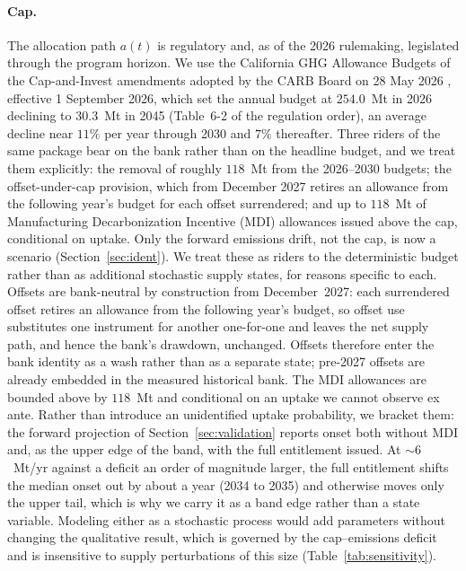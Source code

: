 \documentclass[11pt,letterpaper]{article}
\theoremstyle{plain}
\theoremstyle{definition}
\numberwithin{equation}{section}
\begin{document}
\paragraph{Cap.} The allocation path $a(t)$ is regulatory and, as of the 2026 rulemaking, legislated through the program horizon. We use the California GHG Allowance Budgets of the Cap-and-Invest amendments adopted by the CARB Board on 28 May 2026 \citep{carb2026capinvest}, effective 1 September 2026, which set the annual budget at $254.0$~Mt in 2026 declining to $30.3$~Mt in 2045 (Table~6-2 of the regulation order), an average decline near $11\%$ per year through 2030 and $7\%$ thereafter. Three riders of the same package bear on the bank rather than on the headline budget, and we treat them explicitly: the removal of roughly $118$~Mt from the 2026--2030 budgets; the offset-under-cap provision, which from December 2027 retires an allowance from the following year's budget for each offset surrendered; and up to $118$~Mt of Manufacturing Decarbonization Incentive (MDI) allowances issued above the cap, conditional on uptake. Only the forward emissions drift, not the cap, is now a scenario (Section~\ref{sec:ident}). We treat these as riders to the deterministic budget rather than as additional stochastic supply states, for reasons specific to each. Offsets are bank-neutral by construction from December~2027: each surrendered offset retires an allowance from the following year's budget, so offset use substitutes one instrument for another one-for-one and leaves the net supply path, and hence the bank's drawdown, unchanged. Offsets therefore enter the bank identity as a wash rather than as a separate state; pre-2027 offsets are already embedded in the measured historical bank. The MDI allowances are bounded above by $118$~Mt and conditional on an uptake we cannot observe ex ante. Rather than introduce an unidentified uptake probability, we bracket them: the forward projection of Section~\ref{sec:validation} reports onset both without MDI and, as the upper edge of the band, with the full entitlement issued. At $\sim6$~Mt/yr against a deficit an order of magnitude larger, the full entitlement shifts the median onset out by about a year (2034 to 2035) and otherwise moves only the upper tail, which is why we carry it as a band edge rather than a state variable. Modeling either as a stochastic process would add parameters without changing the qualitative result, which is governed by the cap--emissions deficit and is insensitive to supply perturbations of this size (Table~\ref{tab:sensitivity}).
 
\end{document}
